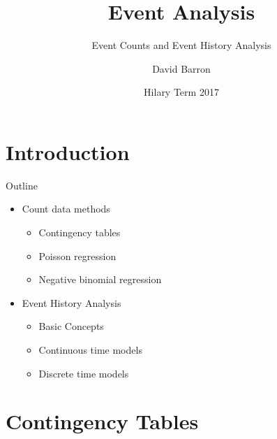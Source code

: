 \documentclass[10pt,ignorenonframetext,]{beamer}
\title{Event Analysis}
\subtitle{Event Counts and Event History Analysis}
\author{David Barron}
\date{Hilary Term 2017}
\providecommand{\tightlist}{%
\setlength{\itemsep}{0pt}\setlength{\parskip}{0pt}}
\begin{document}
\frame{\titlepage}

\section{Introduction}\label{introduction}

\begin{frame}{Outline}

\begin{itemize}
\tightlist
\item
  Count data methods

  \begin{itemize}
  \tightlist
  \item
    Contingency tables
  \item
    Poisson regression
  \item
    Negative binomial regression
  \end{itemize}
\item
  Event History Analysis

  \begin{itemize}
  \tightlist
  \item
    Basic Concepts
  \item
    Continuous time models
  \item
    Discrete time models
  \end{itemize}
\end{itemize}

\end{frame}

\section{Contingency Tables}\label{contingency-tables}
\end{document}
